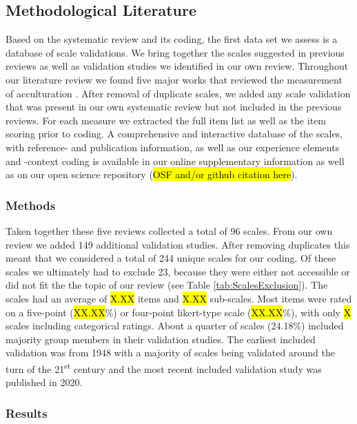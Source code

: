 \subsection{Methodological Literature}

Based on the systematic review and its coding, the first data set we
assess is a database of scale validations. We bring together the scales
suggested in previous reviews as well as validation studies we
identified in our own review. Throughout our literature review we found
five major works that reviewed the measurement of acculturation
\citep{Celenk2011, Maestas2000, Matsudaira2006, Wallace2010, Zane2004}.
After removal of duplicate scales, we added any scale validation that
was present in our own systematic review but not included in the
previous reviews. For each measure we extracted the full item list as
well as the item scoring prior to coding. A comprehensive and
interactive database of the scales, with reference- and publication
information, as well as our experience elements and -context coding is
available in our online supplementary information as well as on our open
science repository (\hl{OSF and/or github citation here}).

\subsubsection{Methods}

Taken together these five reviews collected a total of 96 scales. From
our own review we added 149 additional validation studies. After
removing duplicates this meant that we considered a total of 244 unique
scales for our coding. Of these scales we ultimately had to exclude 23,
because they were either not accessible or did not fit the the topic of
our review (see Table \ref{tab:ScalesExclusion}). The scales had an
average of \hl{X.XX} items and \hl{X.XX} sub-scales. Most items were
rated on a five-point (\hl{XX.XX}\%) or four-point likert-type scale
(\hl{XX.XX}\%), with only \hl{X} scales including categorical ratings.
About a quarter of scales (24.18\%) included majority group members in
their validation studies. The earliest included validation was from 1948
with a majority of scales being validated around the turn of the
21\textsuperscript{st} century and the most recent included validation
study was published in 2020.



\subsubsection{Results}

